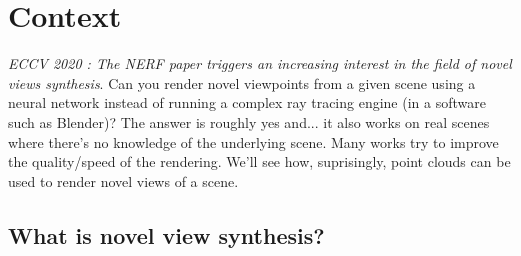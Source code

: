 \section{Context}
\label{sec:Context}

\textit{ECCV 2020 : The NERF \cite*{mildenhall2020nerf} paper triggers an increasing interest in the field of novel views synthesis}. Can you render novel viewpoints from a given scene using a neural network instead of running a complex ray tracing engine (in a software such as Blender)? The answer is roughly yes and... it also works on real scenes where there's no knowledge of the underlying scene. Many works try to improve the quality/speed of the rendering. We'll see how, suprisingly, point clouds can be used to render novel views of a scene.


\subsection*{What is novel view synthesis?}
\label{sec:novel_view_synthesis}


